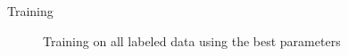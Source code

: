 \documentclass{tikzposter} %
\begin{document}
\begin{columns}
{\begin{minipage}{0.5\linewidth}
    \centering
%
\end{minipage}
\hfill
\begin{minipage}{0.5\linewidth}
    \centering
%
\end{minipage}
}


{
\begin{description}
  \item[Training]
  Training on all labeled data using the best parameters


\end{description}}
\end{columns}
\end{document}
